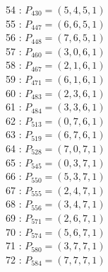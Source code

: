 \documentclass{article}
\begin{document}
{\begin{multicols}{3}
54 : $P_{430}=( 5, 4, 5, 1 )$\\
55 : $P_{447}=( 6, 6, 5, 1 )$\\
56 : $P_{448}=( 7, 6, 5, 1 )$\\
57 : $P_{460}=( 3, 0, 6, 1 )$\\
58 : $P_{467}=( 2, 1, 6, 1 )$\\
59 : $P_{471}=( 6, 1, 6, 1 )$\\
60 : $P_{483}=( 2, 3, 6, 1 )$\\
61 : $P_{484}=( 3, 3, 6, 1 )$\\
62 : $P_{513}=( 0, 7, 6, 1 )$\\
63 : $P_{519}=( 6, 7, 6, 1 )$\\
64 : $P_{528}=( 7, 0, 7, 1 )$\\
65 : $P_{545}=( 0, 3, 7, 1 )$\\
66 : $P_{550}=( 5, 3, 7, 1 )$\\
67 : $P_{555}=( 2, 4, 7, 1 )$\\
68 : $P_{556}=( 3, 4, 7, 1 )$\\
69 : $P_{571}=( 2, 6, 7, 1 )$\\
70 : $P_{574}=( 5, 6, 7, 1 )$\\
71 : $P_{580}=( 3, 7, 7, 1 )$\\
72 : $P_{584}=( 7, 7, 7, 1 )$\\
\end{multicols}


%


%


}%
\end{document}
